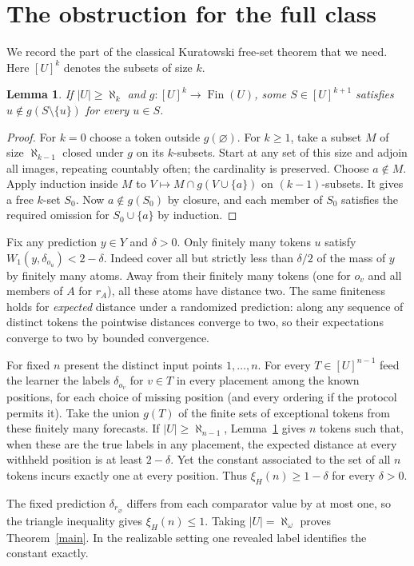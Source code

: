 \documentclass[11pt]{article}
\newtheorem{lemma}[theorem]{Lemma}
\newcommand{\Fin}{\operatorname{Fin}}
\newcommand{\err}{\xi}
\begin{document}
\section{The obstruction for the full class}
We record the part of the classical Kuratowski free-set theorem that we need. Here $[U]^k$ denotes the subsets of size $k$.
\begin{lemma}\label{free}
If $|U|\ge\aleph_k$ and $g:[U]^k\to\Fin(U)$, some $S\in[U]^{k+1}$ satisfies $u\notin g(S\setminus\{u\})$ for every $u\in S$.
\end{lemma}
\begin{proof}
For $k=0$ choose a token outside $g(\varnothing)$. For $k\ge1$, take a subset $M$ of size $\aleph_{k-1}$ closed under $g$ on its $k$-subsets. Start at any set of this size and adjoin all images, repeating countably often; the cardinality is preserved. Choose $a\notin M$. Apply induction inside $M$ to $V\mapsto M\cap g(V\cup\{a\})$ on $(k-1)$-subsets. It gives a free $k$-set $S_0$. Now $a\notin g(S_0)$ by closure, and each member of $S_0$ satisfies the required omission for $S_0\cup\{a\}$ by induction.
\end{proof}

Fix any prediction $y\in Y$ and $\delta>0$. Only finitely many tokens $u$ satisfy $W_1(y,\delta_{o_u})<2-\delta$. Indeed cover all but strictly less than $\delta/2$ of the mass of $y$ by finitely many atoms. Away from their finitely many tokens (one for $o_v$ and all members of $A$ for $r_A$), all these atoms have distance two. The same finiteness holds for \emph{expected} distance under a randomized prediction: along any sequence of distinct tokens the pointwise distances converge to two, so their expectations converge to two by bounded convergence.

For fixed $n$ present the distinct input points $1,\ldots,n$. For every $T\in[U]^{n-1}$ feed the learner the labels $\delta_{o_v}$ for $v\in T$ in every placement among the known positions, for each choice of missing position (and every ordering if the protocol permits it). Take the union $g(T)$ of the finite sets of exceptional tokens from these finitely many forecasts. If $|U|\ge\aleph_{n-1}$, Lemma~\ref{free} gives $n$ tokens such that, when these are the true labels in any placement, the expected distance at every withheld position is at least $2-\delta$. Yet the constant associated to the set of all $n$ tokens incurs exactly one at every position. Thus $\err_H(n)\ge1-\delta$ for every $\delta>0$.

The fixed prediction $\delta_{r_\varnothing}$ differs from each comparator value by at most one, so the triangle inequality gives $\err_H(n)\le1$. Taking $|U|=\aleph_\omega$ proves Theorem~\ref{main}. In the realizable setting one revealed label identifies the constant exactly.
\end{document}
